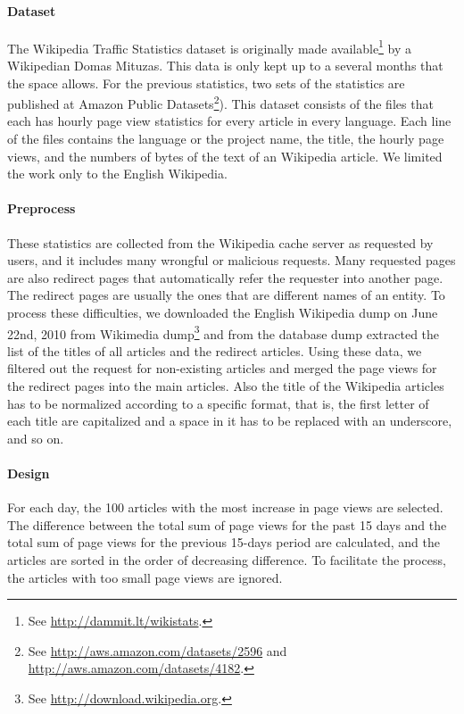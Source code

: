 \documentclass[11pt]{article}
\begin{document}
\paragraph{Dataset}
The Wikipedia Traffic Statistics dataset is originally made available\footnote{See \url{http://dammit.lt/wikistats}.} by a Wikipedian Domas Mituzas.
This data is only kept up to a several months that the space allows.
For the previous statistics, two sets of the statistics are published at Amazon Public Datasets\footnote{See \url{http://aws.amazon.com/datasets/2596} and \url{http://aws.amazon.com/datasets/4182}.}).
This dataset consists of the files that each has hourly page view statistics for every article in every language.
Each line of the files contains the language or the project name, the title, the hourly page views, and the numbers of bytes of the text of an Wikipedia article.
We limited the work only to the English Wikipedia.

\paragraph{Preprocess}
These statistics are collected from the Wikipedia cache server as requested by users, and it includes many wrongful or malicious requests.
Many requested pages are also redirect pages that automatically refer the requester into another page.
The redirect pages are usually the ones that are different names of an entity.
To process these difficulties, we downloaded the English Wikipedia dump on June 22nd, 2010 from Wikimedia dump\footnote{See \url{http://download.wikipedia.org}.} and from the database dump extracted the list of the titles of all articles and the redirect articles.
Using these data, we filtered out the request for non-existing articles and merged the page views for the redirect pages into the main articles.
Also the title of the Wikipedia articles has to be normalized according to a specific format, that is, the first letter of each title are capitalized and a space in it has to be replaced with an underscore, and so on.

\paragraph{Design}
For each day, the 100 articles with the most increase in page views are selected.
The difference between the total sum of page views for the past 15 days
and the total sum of page views for the previous 15-days period are calculated,
and the articles are sorted in the order of decreasing difference.
To facilitate the process, the articles with too small page views are ignored.
\end{document}
